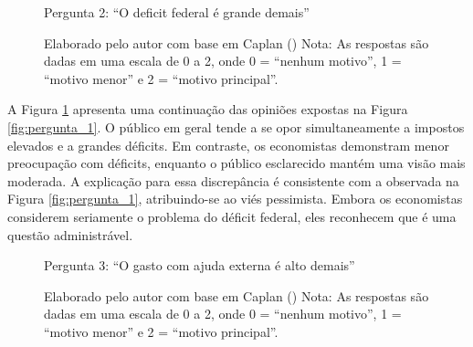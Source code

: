 \begin{figure}[H]
    \centering
    \caption*{Pergunta 2: “O deficit federal é grande demais”}
    \caption{Elaborado pelo autor com base em Caplan (\citeyear{The_Myth_of_the_Rational_Voter}) \newline
    Nota: As respostas são dadas em uma escala de 0 a 2, onde 0 = “nenhum motivo”, 1 = “motivo menor” e 2 = “motivo principal”.}
    \label{fig:pergunta_2}
\end{figure}

A Figura \ref{fig:pergunta_2} apresenta uma continuação das opiniões expostas na Figura \ref{fig:pergunta_1}. O público em geral tende a se opor simultaneamente a impostos elevados e a grandes déficits. Em contraste, os economistas demonstram menor preocupação com déficits, enquanto o público esclarecido mantém uma visão mais moderada. A explicação para essa discrepância é consistente com a observada na Figura \ref{fig:pergunta_1}, atribuindo-se ao viés pessimista. Embora os economistas considerem seriamente o problema do déficit federal, eles reconhecem que é uma questão administrável.


\begin{figure}[H]
    \centering
    \caption*{Pergunta 3: “O gasto com ajuda externa é alto demais”}
    \caption{Elaborado pelo autor com base em Caplan (\citeyear{The_Myth_of_the_Rational_Voter}) \newline
    Nota: As respostas são dadas em uma escala de 0 a 2, onde 0 = “nenhum motivo”, 1 = “motivo menor” e 2 = “motivo principal”.}
    \label{fig:pergunta_3}
\end{figure}

